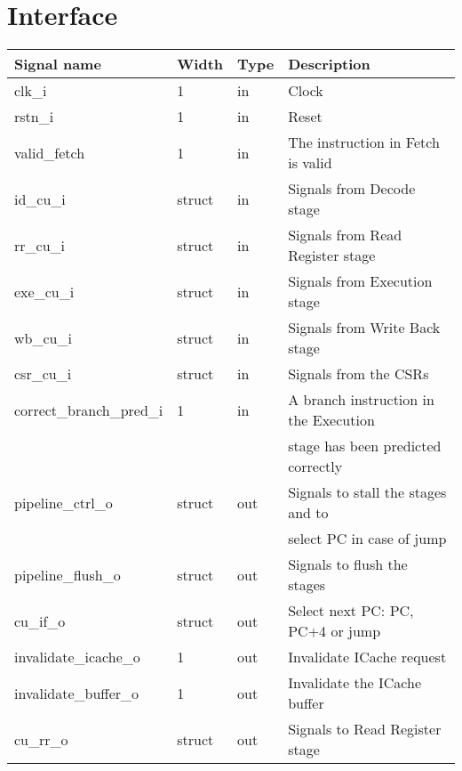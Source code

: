 \section{Interface}
\label{chapter 4}

\begin{table}[H]
\centering
\begin{tabular}{llll}
\textbf{Signal name} & \textbf{Width} & \textbf{Type} & \textbf{Description} \\
\hline
clk\_i & 1 & in & Clock \\
rstn\_i & 1 & in & Reset \\
valid\_fetch & 1 & in & The instruction in Fetch is valid \\
id\_cu\_i & struct & in & Signals from Decode stage \\
rr\_cu\_i & struct & in & Signals from Read Register stage \\
exe\_cu\_i & struct & in & Signals from Execution stage \\
wb\_cu\_i & struct & in &  Signals from Write Back stage\\
csr\_cu\_i & struct & in & Signals from the CSRs \\
correct\_branch\_pred\_i & 1 & in & A branch instruction in the Execution \\
 &  &  & stage has been predicted correctly \\

pipeline\_ctrl\_o & struct & out & Signals to stall the stages and to \\
 &  &  & select PC in case of jump \\
pipeline\_flush\_o & struct & out & Signals to flush the stages \\
cu\_if\_o & struct & out & Select next PC: PC, PC+4 or jump \\
invalidate\_icache\_o & 1 & out & Invalidate ICache request \\
invalidate\_buffer\_o & 1 & out & Invalidate the ICache buffer \\
cu\_rr\_o & struct & out & Signals to Read Register stage \\

\end{tabular}
\end{table}

